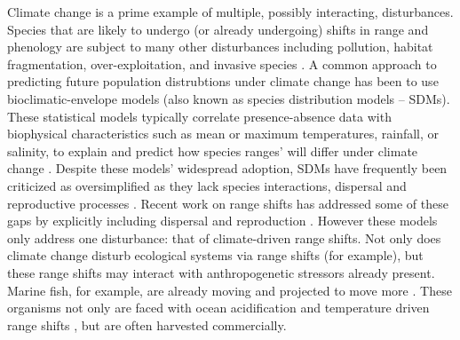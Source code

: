 \documentclass[12pt,english]{article}
\begin{document}
\begin{spacing}{1.9}
\begin{flushleft}
Climate change is a prime example of multiple, possibly interacting, disturbances. Species that are likely to undergo (or already undergoing) shifts in range and phenology are subject to many other disturbances including pollution, habitat fragmentation, over-exploitation, and invasive species \citep{Wilcoveetal1998, Salaetal2000, MEA2005}. A common approach to predicting future population distrubtions under climate change has been to use bioclimatic-envelope models (also known as species distribution models -- SDMs). These statistical models typically correlate presence-absence data with biophysical characteristics such as mean or maximum temperatures, rainfall, or salinity, to explain and predict how species ranges' will differ under climate change \citep{Elithetal2006, GuisanThuiller2005, GuisanZimmerman2000}. Despite these models' widespread adoption, SDMs have frequently been criticized as oversimplified as they lack species interactions, dispersal and reproductive processes \citep{KearneyPorter2009, Zarnetskeetal2012, Robinsonetal2011}. Recent work on range shifts has addressed some of these gaps by explicitly including dispersal and reproduction \citep{Berestyckietal2009, ZhouKot2011}. However these models only address one disturbance: that of climate-driven range shifts. Not only does climate change disturb ecological systems via range shifts (for example), but these range shifts may interact with anthropogenetic stressors already present. Marine fish, for example, are already moving \citep{Perryetal2005, HiddinkHoftstede2008, Rijnsdorpetal2009, Dulvyetal2008, Simpsonetal2011} and projected to move more  \citep{Kelletal2005, Mackenzieetal2007}. These organisms not only are faced with ocean acidification and temperature driven range shifts \citep{Pinskyetal2013, Barryetal1995, Nyeetal2009}, but are often harvested commercially.


\end{flushleft}
\end{spacing}
\end{document}

